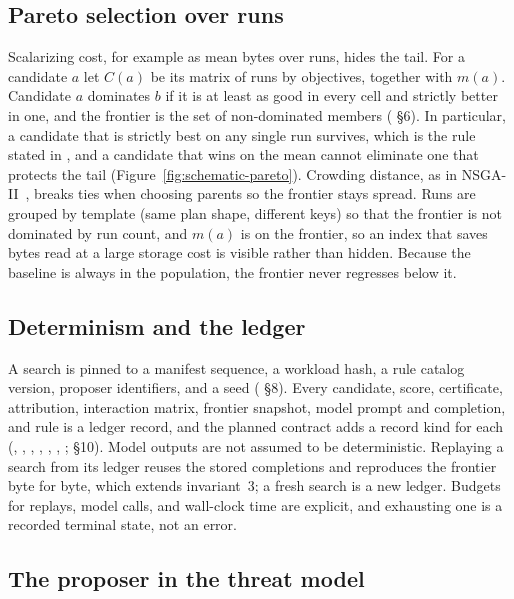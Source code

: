 \subsection{Pareto selection over runs}\label{sec:pareto}

Scalarizing cost, for example as mean bytes over runs, hides the tail. For a
candidate $a$ let $C(a)$ be its matrix of runs by objectives, together with
$m(a)$. Candidate $a$ dominates $b$ if it is at least as good in every cell and
strictly better in one, and the frontier is the set of non-dominated members
( \S6). In particular, a candidate that is strictly best on any
single run survives, which is the rule stated in , and a candidate
that wins on the mean cannot eliminate one that protects the tail
(Figure~\ref{fig:schematic-pareto}). Crowding distance,
as in NSGA-II~\cite{nsga2}, breaks ties when choosing parents so the frontier
stays spread. Runs are grouped by template (same plan shape, different keys) so
that the frontier is not dominated by run count, and $m(a)$ is on the frontier,
so an index that saves bytes read at a large storage cost is visible rather than
hidden. Because the baseline is always in the population, the frontier never
regresses below it.

\subsection{Determinism and the ledger}\label{sec:determinism}

A search is pinned to a manifest sequence, a workload hash, a rule catalog
version, proposer identifiers, and a seed ( \S8). Every
candidate, score, certificate, attribution, interaction matrix, frontier
snapshot, model prompt and completion, and rule is a ledger record, and the
planned contract adds a record kind for each (,
, , , ,
, ;  \S10). Model outputs are not assumed to be
deterministic. Replaying a search from its ledger reuses the stored completions
and reproduces the frontier byte for byte, which extends invariant~3; a fresh
search is a new ledger. Budgets for replays, model calls, and wall-clock time
are explicit, and exhausting one is a recorded terminal state, not an error.

\subsection{The proposer in the threat model}\label{sec:proposerthreat}

